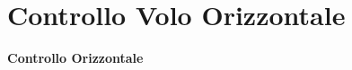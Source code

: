 \documentclass[aspectratio=169]{beamer} %
\begin{document}



\section{Controllo Volo Orizzontale}

\begin{frame}
    \vfill
    \centering
    {\Huge \textbf{Controllo Orizzontale}}
    \vfill
\end{frame}
\end{document}
